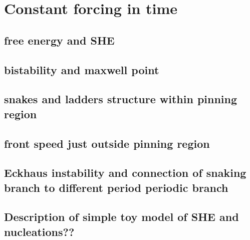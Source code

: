 \documentclass[../main/TimeForcingSHE.tex]{subfiles}
\begin{document}
\section{Constant forcing in time }

\FIGshesnaking

\subsection{free energy and SHE}
\subsection{bistability and maxwell point}
\subsection{snakes and ladders structure within pinning region}
\subsection{front speed just outside pinning region}
\subsection{Eckhaus instability and connection of snaking branch to different period periodic branch}
\subsection{Description of simple toy model of SHE and nucleations??}
\end{document}
